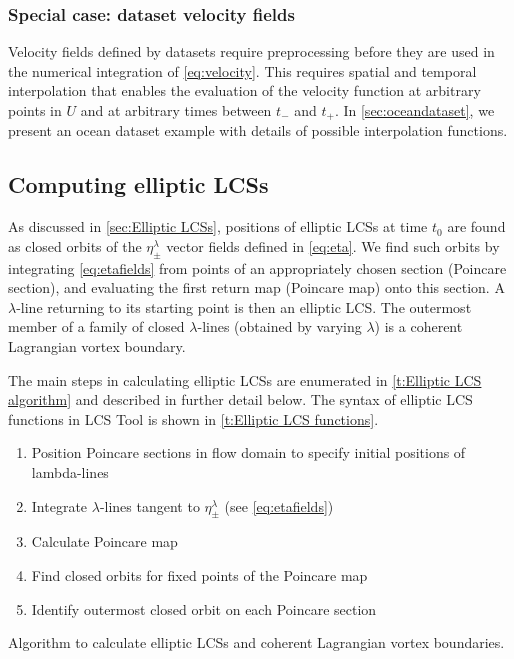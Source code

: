 \documentclass[5p]{elsarticle}
\begin{document}
\subsubsection{Special case: dataset velocity fields}

Velocity fields defined by datasets require preprocessing before they are used in the numerical integration of \cref{eq:velocity}. This requires spatial and temporal interpolation that enables the evaluation of the velocity function at arbitrary points in $U$ and at arbitrary times between $t_-$ and $t_+$. In \cref{sec:oceandataset}, we present an ocean dataset example with details of possible interpolation functions.

\subsection{Computing elliptic LCSs}

As discussed in \cref{sec:Elliptic LCSs}, positions of elliptic LCSs at time $t_0$ are found as closed orbits of the $\eta_\pm^\lambda$ vector fields defined in \cref{eq:eta}. We find such orbits by integrating \cref{eq:etafields} from points of an appropriately chosen section (Poincare section), and evaluating the first return map (Poincare map) onto this section. A $\lambda$-line returning to its starting point is then an elliptic LCS. The outermost member of a family of closed $\lambda$-lines (obtained by varying $\lambda$) is a coherent Lagrangian vortex boundary\citep{haller13:_coher_lagran,haller14:_adden_coher_lagran}.

The main steps in calculating elliptic LCSs are enumerated in \cref{t:Elliptic LCS algorithm} and described in further detail below. The syntax of elliptic LCS functions in LCS Tool is shown in \cref{t:Elliptic LCS functions}.

\begin{table}
\begin{center}
\begin{enumerate}
\item Position Poincare sections in flow domain to specify initial positions of lambda-lines
\item Integrate $\lambda$-lines tangent to $\eta_\pm^\lambda$ (see \cref{eq:etafields})
\item Calculate Poincare map
\item Find closed orbits for fixed points of the Poincare map
\item Identify outermost closed orbit on each Poincare section
\end{enumerate}
\end{center}
\caption{Algorithm to calculate elliptic LCSs and coherent Lagrangian vortex boundaries.}
\label{t:Elliptic LCS algorithm}
\end{table}
\end{document}
